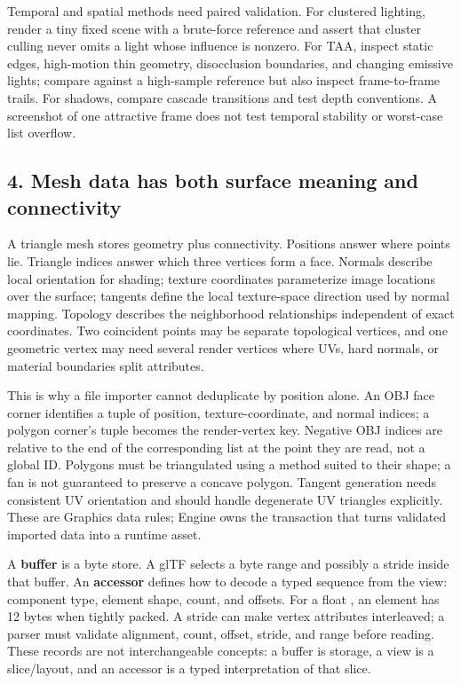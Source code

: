 Temporal and spatial methods need paired validation. For clustered lighting, render a tiny fixed scene with a brute-force reference and assert that cluster culling never omits a light whose influence is nonzero. For TAA, inspect static edges, high-motion thin geometry, disocclusion boundaries, and changing emissive lights; compare against a high-sample reference but also inspect frame-to-frame trails. For shadows, compare cascade transitions and test depth conventions. A screenshot of one attractive frame does not test temporal stability or worst-case list overflow.

\subsection{4. Mesh data has both surface meaning and connectivity}\label{04-visual-computing-ii-ch037-mesh-data-has-both-surface-meaning-and-connectivity}

\hypertarget{04-visual-computing-ii-ch037-mesh-data-has-both-surface-meaning-and-connectivity}{}

A triangle mesh stores geometry plus connectivity. Positions answer where points lie. Triangle indices answer which three vertices form a face. Normals describe local orientation for shading; texture coordinates parameterize image locations over the surface; tangents define the local texture-space direction used by normal mapping. Topology describes the neighborhood relationships independent of exact coordinates. Two coincident points may be separate topological vertices, and one geometric vertex may need several render vertices where UVs, hard normals, or material boundaries split attributes.

This is why a file importer cannot deduplicate by position alone. An OBJ face corner identifies a tuple of position, texture-coordinate, and normal indices; a polygon corner's tuple becomes the render-vertex key. Negative OBJ indices are relative to the end of the corresponding list at the point they are read, not a global ID. Polygons must be triangulated using a method suited to their shape; a fan is not guaranteed to preserve a concave polygon. Tangent generation needs consistent UV orientation and should handle degenerate UV triangles explicitly. These are Graphics data rules; Engine owns the transaction that turns validated imported data into a runtime asset.

A \textbf{buffer} is a byte store. A glTF  selects a byte range and possibly a stride inside that buffer. An \textbf{accessor} defines how to decode a typed sequence from the view: component type, element shape, count, and offsets. For a float , an element has 12 bytes when tightly packed. A stride can make vertex attributes interleaved; a parser must validate alignment, count, offset, stride, and range before reading. These records are not interchangeable concepts: a buffer is storage, a view is a slice/layout, and an accessor is a typed interpretation of that slice.

